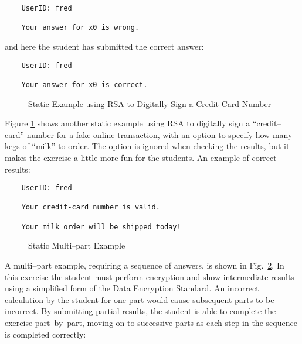 \documentclass[12pt]{article}
\begin{document}
\begin{verbatim}
    UserID: fred

    Your answer for x0 is wrong.
\end{verbatim}

and here the student has submitted the correct answer:

\begin{verbatim}
    UserID: fred

    Your answer for x0 is correct.
\end{verbatim}

\begin{figure}[ht]
\begin{center}
\caption{Static Example using RSA to Digitally Sign a Credit Card Number}
\label{fig:milk}
\end{center}
\end{figure}

\vspace{11pt}

Figure \ref{fig:milk} shows another static example
using RSA to digitally sign a ``credit--card'' number for a fake online
transaction, with an option to specify how many kegs of ``milk'' to order.
The option is ignored when checking the results, but it makes the exercise
a little more fun for the students.  An example of correct results:

\begin{verbatim}
    UserID: fred

    Your credit-card number is valid.

    Your milk order will be shipped today!
\end{verbatim}


\begin{figure}[ht]
\begin{center}
\caption{Static Multi--part Example}
\label{fig:sdesp}
\end{center}
\end{figure}

A multi--part example, requiring a sequence of answers, is shown in
Fig.\ \ref{fig:sdesp}.
In this exercise the student must perform encryption
and show intermediate results using a simplified form of the Data Encryption Standard.
An incorrect calculation by the
student for one part would cause subsequent parts to be incorrect.
By submitting partial results, the student is able to complete
the exercise part--by--part, moving on to successive parts as each
step in the sequence is completed correctly:
\end{document}
